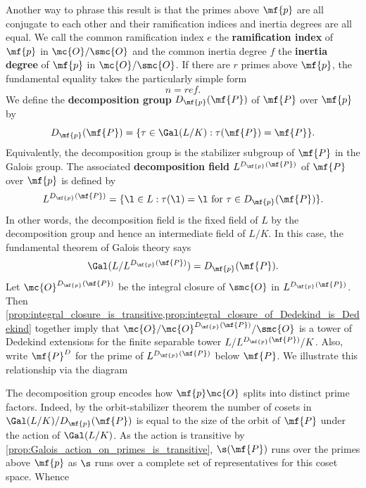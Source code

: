 \documentclass[12pt]{article}
\begin{document}
      Another way to phrase this result is that the primes above \(\mf{p}\) are all conjugate to each other and their ramification indices and inertia degrees are all equal. We call the common ramification index \(e\) the \textbf{ramification index} of \(\mf{p}\) in \(\mc{O}/\smc{O}\) and the common inertia degree \(f\) the \textbf{inertia degree} of \(\mf{p}\) in \(\mc{O}/\smc{O}\). If there are \(r\) primes above \(\mf{p}\), the fundamental equality takes the particularly simple form
      \[
        n = ref.
      \]
      We define the \textbf{decomposition group} \(D_{\mf{p}}(\mf{P})\) of \(\mf{P}\) over \(\mf{p}\) by
      \[
        D_{\mf{p}}(\mf{P}) = \{\tau \in \Gal(L/K):\tau(\mf{P}) = \mf{P}\}.
      \]
      Equivalently, the decomposition group is the stabilizer subgroup of \(\mf{P}\) in the Galois group. The associated \textbf{decomposition field} \(L^{D_{\mf{p}}(\mf{P})}\) of \(\mf{P}\) over \(\mf{p}\) is defined by
      \[
        L^{D_{\mf{p}}(\mf{P})} = \{\l \in L:\tau(\l) = \l \text{ for } \tau \in D_{\mf{p}}(\mf{P})\}.
      \]
      In other words, the decomposition field is the fixed field of \(L\) by the decomposition group and hence an intermediate field of \(L/K\). In this case, the fundamental theorem of Galois theory says
      \[
        \Gal(L/L^{D_{\mf{p}}(\mf{P})}) = D_{\mf{p}}(\mf{P}).
      \]
      Let \(\mc{O}^{D_{\mf{p}}(\mf{P})}\) be the integral closure of \(\smc{O}\) in \(L^{D_{\mf{p}}(\mf{P})}\). Then \cref{prop:integral_closure_is_transitive,prop:integral_closure_of_Dedekind_is_Dedekind} together imply that \(\mc{O}/\mc{O}^{D_{\mf{p}}(\mf{P})}/\smc{O}\) is a tower of Dedekind extensions for the finite separable tower \(L/L^{D_{\mf{p}}(\mf{P})}/K\). Also, write \(\mf{P}^{D}\) for the prime of \(L^{D_{\mf{p}}(\mf{P})}\) below \(\mf{P}\). We illustrate this relationship via the diagram
      \begin{center}
      \end{center}
      The decomposition group encodes how \(\mf{p}\mc{O}\) splits into distinct prime factors. Indeed, by the orbit-stabilizer theorem the number of cosets in \(\Gal(L/K)/D_{\mf{p}}(\mf{P})\) is equal to the size of the orbit of \(\mf{P}\) under the action of \(\Gal(L/K)\). As the action is transitive by \cref{prop:Galois_action_on_primes_is_transitive}, \(\s(\mf{P})\) runs over the primes above \(\mf{p}\) as \(\s\) runs over a complete set of representatives for this coset space. Whence
\end{document}
